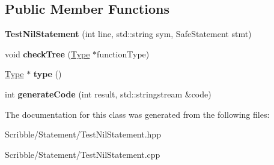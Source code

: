\subsection*{Public Member Functions}
\begin{DoxyCompactItemize}
\item 
\hypertarget{class_test_nil_statement_a22b272f07796f81c7e7f82ca8ce4156c}{{\bfseries Test\-Nil\-Statement} (int line, std\-::string sym, Safe\-Statement stmt)}\label{class_test_nil_statement_a22b272f07796f81c7e7f82ca8ce4156c}

\item 
\hypertarget{class_test_nil_statement_a31be20f2dbac1b8be2cc11633841fa6b}{void {\bfseries check\-Tree} (\hyperlink{class_type}{Type} $\ast$function\-Type)}\label{class_test_nil_statement_a31be20f2dbac1b8be2cc11633841fa6b}

\item 
\hypertarget{class_test_nil_statement_a226aa3e9583124ac709ef6ae91057846}{\hyperlink{class_type}{Type} $\ast$ {\bfseries type} ()}\label{class_test_nil_statement_a226aa3e9583124ac709ef6ae91057846}

\item 
\hypertarget{class_test_nil_statement_a7c420de7fc09c1be6f694af2f96ae4ae}{int {\bfseries generate\-Code} (int result, std\-::stringstream \&code)}\label{class_test_nil_statement_a7c420de7fc09c1be6f694af2f96ae4ae}

\end{DoxyCompactItemize}


The documentation for this class was generated from the following files\-:\begin{DoxyCompactItemize}
\item 
Scribble/\-Statement/Test\-Nil\-Statement.\-hpp\item 
Scribble/\-Statement/Test\-Nil\-Statement.\-cpp\end{DoxyCompactItemize}
